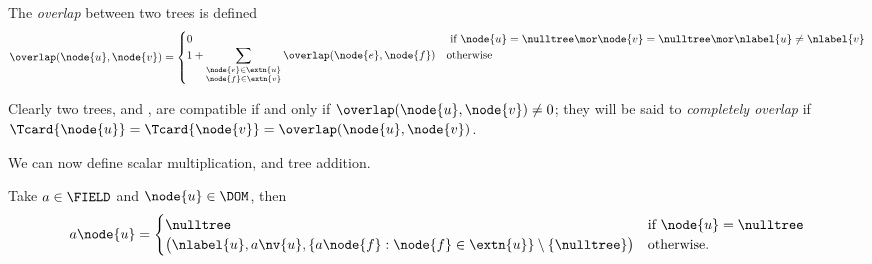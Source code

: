 The \emph{overlap} between two trees is defined
  \begin{align*}
    \overlap(\node{u},\node{v}) = \begin{cases}
      0 & \text{ if } \node{u} = \nulltree \mor \node{v} = \nulltree \mor \nlabel{u} \neq \nlabel{v} \\
      1 + \displaystyle\sum_{\substack{\node{e}\in\extn{u} \\ \node{f}\in\extn{v}}} \overlap(\node{e},\node{f}) & \text{otherwise}
    \end{cases}
  \end{align*}

  Clearly two trees,  and , are compatible if and only if \(\overlap(\node{u},\node{v}) \neq 0 \); they will
  be said to \emph{completely overlap} if \(\Tcard{\node{u}} = \Tcard{\node{v}} =
  \overlap(\node{u},\node{v})\).



We can now define scalar multiplication, and tree addition.
\begin{definition}\label{defscalar*}
  Take $a \in \FIELD$ and $\node{u} \in \DOM$, then
  \begin{equation}
    a\node{u} = \begin{cases}
      \nulltree & \text{if } \node{u} = \nulltree \\      
      \bigl(\nlabel{u}, a\nv{u}, \{a\node{f}: \node{f} \in \extn{u}\}\setminus\{\nulltree\}\bigr) & \text{otherwise.}
    \end{cases}
  \end{equation}
\end{definition}




